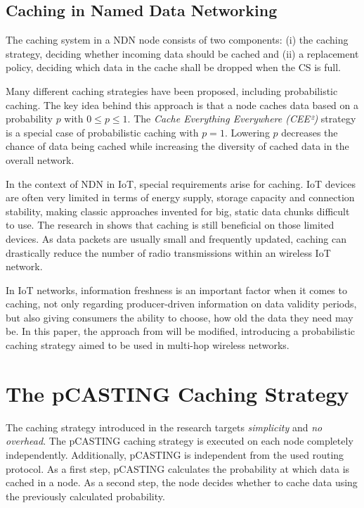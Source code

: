 \documentclass[conference]{IEEEtran}
\begin{document}
\subsection{Caching in Named Data Networking}

The caching system in a NDN node consists of two components: (i) the caching strategy, deciding whether incoming data should be cached and (ii) a replacement policy, deciding which data in the cache shall be dropped when the CS is full.

Many different caching strategies have been proposed, including probabilistic caching\cite{Tarnoi2014}. The key idea behind this approach is that a node caches data based on a probability $p$ with $0 \leq p \leq 1$. The \textit{Cache Everything Everywhere (CEE²)} strategy is a special case of probabilistic caching with $p = 1$. Lowering $p$ decreases the chance of data being cached while increasing the diversity of cached data in the overall network.

In the context of NDN in IoT, special requirements arise for caching. IoT devices are often very limited in terms of energy supply, storage capacity and connection stability, making classic approaches invented for big, static data chunks difficult to use. The research in \cite{Baccelli2014} shows that caching is still beneficial on those limited devices. As data packets are usually small and frequently updated, caching can drastically reduce the number of radio transmissions within an wireless IoT network.

In IoT networks, information freshness is an important factor when it comes to caching\cite{Quevedo2014}, not only regarding producer-driven information on data validity periods, but also giving consumers the ability to choose, how old the data they need may be. In this paper, the approach from \cite{Vural2014} will be modified, introducing a probabilistic caching strategy aimed to be used in multi-hop wireless networks.

\section{The pCASTING Caching Strategy}
\label{sec:pcasting}

The caching strategy introduced in the research targets \textit{simplicity} and \textit{no overhead}. The pCASTING caching strategy is executed on each node completely independently. Additionally, pCASTING is independent from the used routing protocol\cite{Amadeo2014}. As a first step, pCASTING calculates the probability at which data is cached in a node. As a second step, the node decides whether to cache data using the previously calculated probability.
\end{document}

